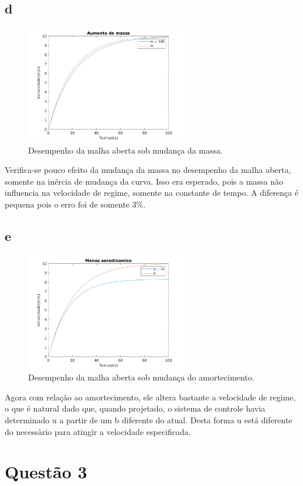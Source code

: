 \documentclass{article}[twocolumn]
\begin{document}
	\subsection{d}
	\begin{figure}[H]
		\centering
		\includegraphics[width=7cm]{2d.png}
		\caption{Desempenho da malha aberta sob mudan\c{c}a da massa.}
	\end{figure}
	Verifica-se pouco efeito da mudan\c{c}a da massa no desempenho da malha aberta, somente
	na in\'ercia de mudan\c{c}a da curva. Isso era esperado, pois a massa n\~ao influencia na
	velocidade de regime, somente na constante de tempo. A diferen\c{c}a \'e pequena
	pois o erro foi de somente 3\%.
	\subsection{e}
	\begin{figure}[H]
		\centering
		\includegraphics[width=7cm]{2e.png}
		\caption{Desempenho da malha aberta sob mudan\c{c}a do amortecimento.}
	\end{figure}
	Agora com rela\c{c}\~ao ao amortecimento, ele altera bastante a velocidade de regime, o
	que \'e natural dado que, quando projetado, o sistema de controle havia determinado u
	a partir de um b diferente do atual. Desta forma u est\'a diferente do necess\`ario
	para atingir a velocidade especificada.
	\section{Quest\~ao 3}
\end{document}
